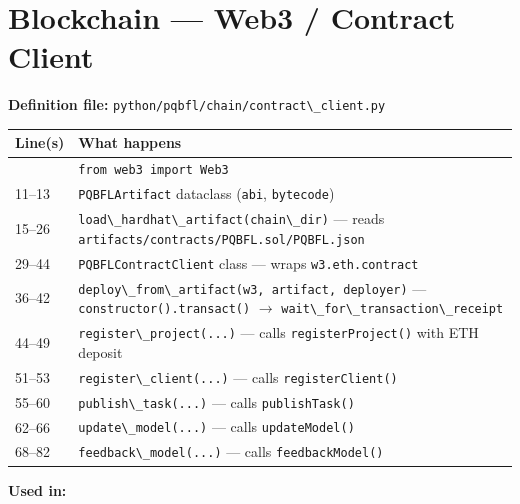 \documentclass[11pt,a4paper]{article}
\newcommand{\code}[1]{\lstinline[basicstyle=\ttfamily\small]!#1!}
\begin{document}
\section{Blockchain --- Web3 / Contract Client}

\textbf{Definition file:} \code{python/pqbfl/chain/contract\_client.py}

\begin{longtable}{L{2.2cm} L{11.5cm}}
\toprule
\textbf{Line(s)} & \textbf{What happens} \\
\midrule
\endhead
\bottomrule
{}       & \code{from web3 import Web3} \\
11--13  & \code{PQBFLArtifact} dataclass (\code{abi}, \code{bytecode}) \\
15--26  & \code{load\_hardhat\_artifact(chain\_dir)} --- reads \code{artifacts/contracts/PQBFL.sol/PQBFL.json} \\
29--44  & \code{PQBFLContractClient} class --- wraps \code{w3.eth.contract} \\
36--42  & \code{deploy\_from\_artifact(w3, artifact, deployer)} --- \code{constructor().transact()} $\to$ \code{wait\_for\_transaction\_receipt} \\
44--49  & \code{register\_project(...)} --- calls \code{registerProject()} with ETH deposit \\
51--53  & \code{register\_client(...)} --- calls \code{registerClient()} \\
55--60  & \code{publish\_task(...)} --- calls \code{publishTask()} \\
62--66  & \code{update\_model(...)} --- calls \code{updateModel()} \\
68--82  & \code{feedback\_model(...)} --- calls \code{feedbackModel()} \\
\end{longtable}

\textbf{Used in:}
\end{document}

